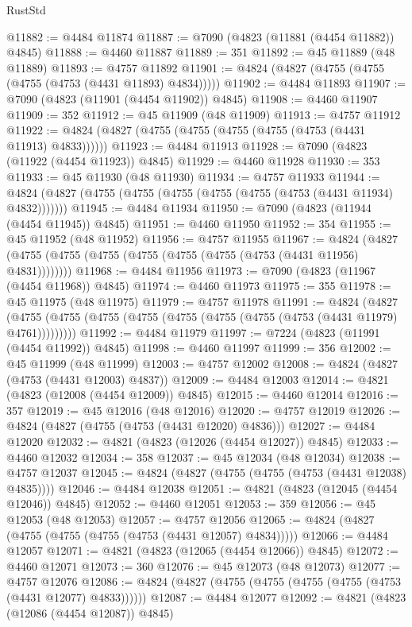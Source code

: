 \begin{lexlean}{RustStd}
\begin{coremodule}
@11882 := @4484 @11874
@11887 := @7090 (@4823 (@11881 (@4454 @11882)) @4845)
@11888 := @4460 @11887
@11889 := 351
@11892 := @45 @11889 (@48 @11889)
@11893 := @4757 @11892
@11901 := @4824 (@4827 (@4755 (@4755 (@4755 (@4753 (@4431 @11893) @4834)))))
@11902 := @4484 @11893
@11907 := @7090 (@4823 (@11901 (@4454 @11902)) @4845)
@11908 := @4460 @11907
@11909 := 352
@11912 := @45 @11909 (@48 @11909)
@11913 := @4757 @11912
@11922 := @4824 (@4827 (@4755 (@4755 (@4755 (@4755 (@4753 (@4431 @11913) @4833))))))
@11923 := @4484 @11913
@11928 := @7090 (@4823 (@11922 (@4454 @11923)) @4845)
@11929 := @4460 @11928
@11930 := 353
@11933 := @45 @11930 (@48 @11930)
@11934 := @4757 @11933
@11944 := @4824 (@4827 (@4755 (@4755 (@4755 (@4755 (@4755 (@4753 (@4431 @11934) @4832)))))))
@11945 := @4484 @11934
@11950 := @7090 (@4823 (@11944 (@4454 @11945)) @4845)
@11951 := @4460 @11950
@11952 := 354
@11955 := @45 @11952 (@48 @11952)
@11956 := @4757 @11955
@11967 := @4824 (@4827 (@4755 (@4755 (@4755 (@4755 (@4755 (@4755 (@4753 (@4431 @11956) @4831))))))))
@11968 := @4484 @11956
@11973 := @7090 (@4823 (@11967 (@4454 @11968)) @4845)
@11974 := @4460 @11973
@11975 := 355
@11978 := @45 @11975 (@48 @11975)
@11979 := @4757 @11978
@11991 := @4824
    (@4827 (@4755 (@4755 (@4755 (@4755 (@4755 (@4755 (@4755 (@4753 (@4431 @11979) @4761)))))))))
@11992 := @4484 @11979
@11997 := @7224 (@4823 (@11991 (@4454 @11992)) @4845)
@11998 := @4460 @11997
@11999 := 356
@12002 := @45 @11999 (@48 @11999)
@12003 := @4757 @12002
@12008 := @4824 (@4827 (@4753 (@4431 @12003) @4837))
@12009 := @4484 @12003
@12014 := @4821 (@4823 (@12008 (@4454 @12009)) @4845)
@12015 := @4460 @12014
@12016 := 357
@12019 := @45 @12016 (@48 @12016)
@12020 := @4757 @12019
@12026 := @4824 (@4827 (@4755 (@4753 (@4431 @12020) @4836)))
@12027 := @4484 @12020
@12032 := @4821 (@4823 (@12026 (@4454 @12027)) @4845)
@12033 := @4460 @12032
@12034 := 358
@12037 := @45 @12034 (@48 @12034)
@12038 := @4757 @12037
@12045 := @4824 (@4827 (@4755 (@4755 (@4753 (@4431 @12038) @4835))))
@12046 := @4484 @12038
@12051 := @4821 (@4823 (@12045 (@4454 @12046)) @4845)
@12052 := @4460 @12051
@12053 := 359
@12056 := @45 @12053 (@48 @12053)
@12057 := @4757 @12056
@12065 := @4824 (@4827 (@4755 (@4755 (@4755 (@4753 (@4431 @12057) @4834)))))
@12066 := @4484 @12057
@12071 := @4821 (@4823 (@12065 (@4454 @12066)) @4845)
@12072 := @4460 @12071
@12073 := 360
@12076 := @45 @12073 (@48 @12073)
@12077 := @4757 @12076
@12086 := @4824 (@4827 (@4755 (@4755 (@4755 (@4755 (@4753 (@4431 @12077) @4833))))))
@12087 := @4484 @12077
@12092 := @4821 (@4823 (@12086 (@4454 @12087)) @4845)

\end{coremodule}
\end{lexlean}
